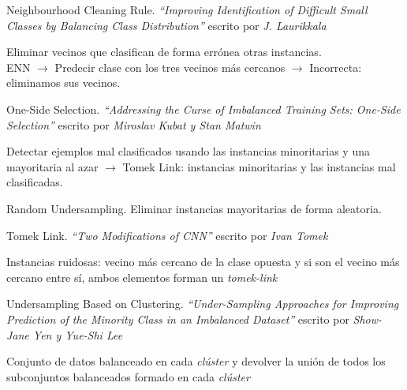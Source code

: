 \documentclass[10pt]{beamer}
\begin{document}
\begin{frame}[fragile]{Neighbourhood Cleaning Rule.}
\textit{``Improving Identification of Difficult Small Classes by Balancing Class Distribution''} escrito por \textit{J. Laurikkala} \cite{ncl} \\
\bigskip
\bigskip

Eliminar vecinos que clasifican de forma errónea otras instancias. \\
ENN $\rightarrow$ Predecir clase con los tres vecinos más cercanos $\rightarrow$ Incorrecta: eliminamos sus vecinos.
\end{frame}

\begin{frame}[fragile]{One-Side Selection.}
\textit{``Addressing the Curse of Imbalanced Training Sets: One-Side Selection''} escrito por \textit{Miroslav Kubat y Stan Matwin} \cite{oss} \\
\bigskip
\bigskip

Detectar ejemplos mal clasificados usando las instancias minoritarias y una mayoritaria al azar $\rightarrow$ Tomek Link: instancias minoritarias y las instancias mal clasificadas.
\end{frame}

\begin{frame}[fragile]{Random Undersampling.}
Eliminar instancias mayoritarias de forma aleatoria. \\
\end{frame}

\begin{frame}[fragile]{Tomek Link.}
\textit{``Two Modifications of CNN''} escrito por \textit{Ivan Tomek} \cite{tl} \\
\bigskip
\bigskip

Instancias ruidosas: vecino más cercano de la clase opuesta y si son el vecino más cercano entre sí, ambos elementos forman un \textit{tomek-link}
\end{frame}

\begin{frame}[fragile]{Undersampling Based on Clustering.}
\textit{``Under-Sampling Approaches for Improving Prediction of the Minority Class in an Imbalanced Dataset''} escrito por \textit{Show-Jane Yen y Yue-Shi Lee} \cite{sbc} \\
\bigskip
\bigskip

Conjunto de datos balanceado en cada \textit{clúster} y devolver la unión de todos los subconjuntos balanceados formado en cada \textit{clúster}
\end{frame}
\end{document}
